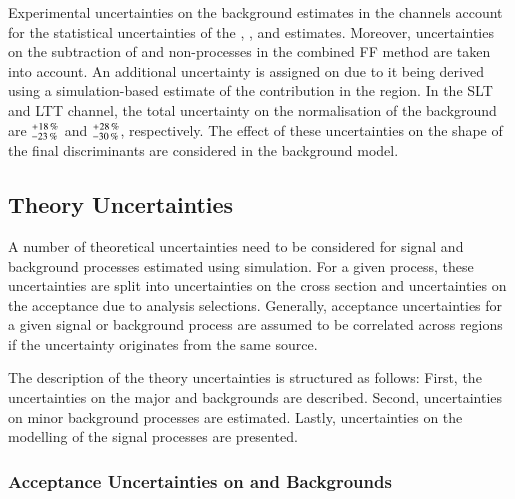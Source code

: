 Experimental uncertainties on the \faketauhadvis background estimates in the
\lephad channels account for the statistical uncertainties of the \FFqcd,
\FFttbar, and \rqcd estimates. Moreover, uncertainties on the subtraction of
\ttbar and non-\ttbar processes in the combined FF method are taken into
account. An additional uncertainty is assigned on \rqcd due to it being derived
using a simulation-based estimate of the \ttbarFakes contribution in the \antiid
region. In the \lephad SLT and LTT channel, the total uncertainty on the
normalisation of the \faketauhadvis background are
$^{\hspace{0.25pt}+\hspace{0.25pt}18\,\%}_{-23\,\%}$ and
$^{\hspace{0.25pt}+\hspace{0.25pt}28\,\%}_{-30\,\%}$, respectively. The effect
of these uncertainties on the shape of the final discriminants are considered in
the background model.



\subsection{Theory Uncertainties}%
\label{sec:modelling_uncertainties}%
\label{sec:theory_uncertainties}

A number of theoretical uncertainties need to be considered for signal and
background processes estimated using simulation. For a given process, these
uncertainties are split into uncertainties on the cross section and
uncertainties on the acceptance due to analysis selections. Generally,
acceptance uncertainties for a given signal or background process are assumed to
be correlated across regions if the uncertainty originates from the same source.

The description of the theory uncertainties is structured as follows: First, the
uncertainties on the major \ZHF and \ttbar backgrounds are described. Second,
uncertainties on minor background processes are estimated. Lastly, uncertainties
on the modelling of the signal processes are presented.


\subsubsection{Acceptance Uncertainties on \ZHF and \ttbar Backgrounds}

